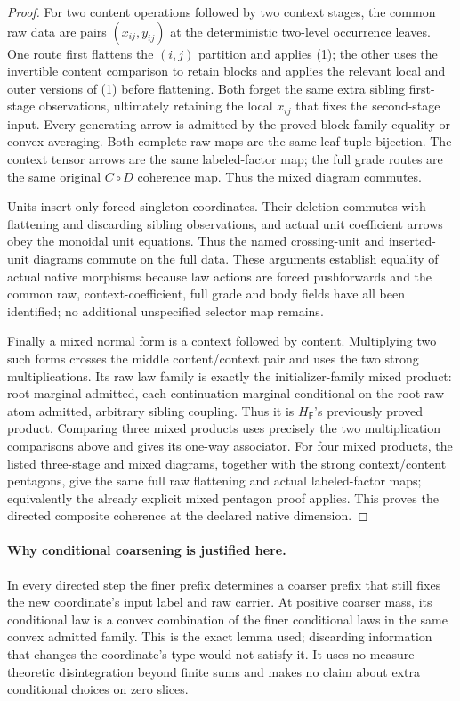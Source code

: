 \documentclass[11pt]{article}
\begin{document}
\begin{proof}
For two content operations followed by two context stages, the common raw data are pairs $(x_{ij},y_{ij})$ at the deterministic two-level occurrence leaves. One route first flattens the $(i,j)$ partition and applies (1); the other uses the invertible content comparison to retain blocks and applies the relevant local and outer versions of (1) before flattening. Both forget the same extra sibling first-stage observations, ultimately retaining the local $x_{ij}$ that fixes the second-stage input. Every generating arrow is admitted by the proved block-family equality or convex averaging. Both complete raw maps are the same leaf-tuple bijection. The context tensor arrows are the same labeled-factor map; the full grade routes are the same original $C\circ D$ coherence map. Thus the mixed diagram commutes.

Units insert only forced singleton coordinates. Their deletion commutes with flattening and discarding sibling observations, and actual unit coefficient arrows obey the monoidal unit equations. Thus the named crossing-unit and inserted-unit diagrams commute on the full data. These arguments establish equality of actual native morphisms because law actions are forced pushforwards and the common raw, context-coefficient, full grade and body fields have all been identified; no additional unspecified selector map remains.

Finally a mixed normal form is a context followed by content. Multiplying two such forms crosses the middle content/context pair and uses the two strong multiplications. Its raw law family is exactly the initializer-family mixed product: root marginal admitted, each continuation marginal conditional on the root raw atom admitted, arbitrary sibling coupling. Thus it is $H_{\mathsf F}$'s previously proved product. Comparing three mixed products uses precisely the two multiplication comparisons above and gives its one-way associator. For four mixed products, the listed three-stage and mixed diagrams, together with the strong context/content pentagons, give the same full raw flattening and actual labeled-factor maps; equivalently the already explicit mixed pentagon proof applies. This proves the directed composite coherence at the declared native dimension.\end{proof}

\paragraph{Why conditional coarsening is justified here.} In every directed step the finer prefix determines a coarser prefix that still fixes the new coordinate's input label and raw carrier. At positive coarser mass, its conditional law is a convex combination of the finer conditional laws in the same convex admitted family. This is the exact lemma used; discarding information that changes the coordinate's type would not satisfy it. It uses no measure-theoretic disintegration beyond finite sums and makes no claim about extra conditional choices on zero slices.
\end{document}

